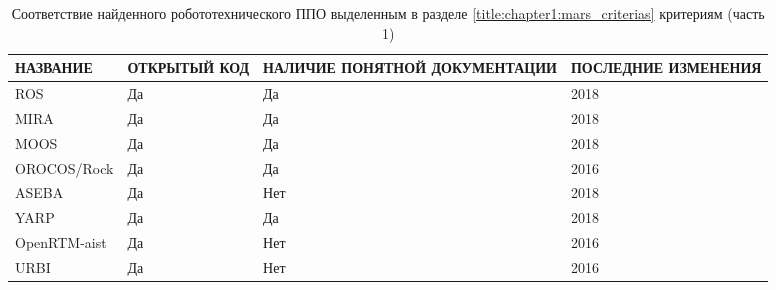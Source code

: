 \begin{table*}[h!]
	\centering
	\caption{Соответствие найденного робототехнического ППО выделенным в разделе \ref{title:chapter1:mars_criterias} критериям (часть 1)}
	\label{table:chapter1:mars_solutions_1}
	\def\arraystretch{1.3}
		\begin{tabular}{|l|p{3cm}|p{4.6cm}|p{3.6cm}|}
			\hline
			\textbf{НАЗВАНИЕ}     & \textbf{ОТКРЫТЫЙ КОД} & \textbf{НАЛИЧИЕ ПОНЯТНОЙ ДОКУМЕНТАЦИИ} & \textbf{ПОСЛЕДНИЕ ИЗМЕНЕНИЯ} \\ \hline
			ROS          & Да           & Да                            & 2018 \\ \hline
			MIRA         & Да           & Да                            & 2018 \\ \hline
			MOOS         & Да           & Да                            & 2018 \\ \hline
			OROCOS/Rock  & Да           & Да                            & 2016    \\ \hline
			ASEBA        & Да           & Нет                           & 2018 \\ \hline
			YARP         & Да           & Да                            & 2018 \\ \hline
			OpenRTM-aist & Да           & Нет                           & 2016    \\ \hline
			URBI         & Да           & Нет                           & 2016    \\ \hline
		\end{tabular}
\end{table*}

